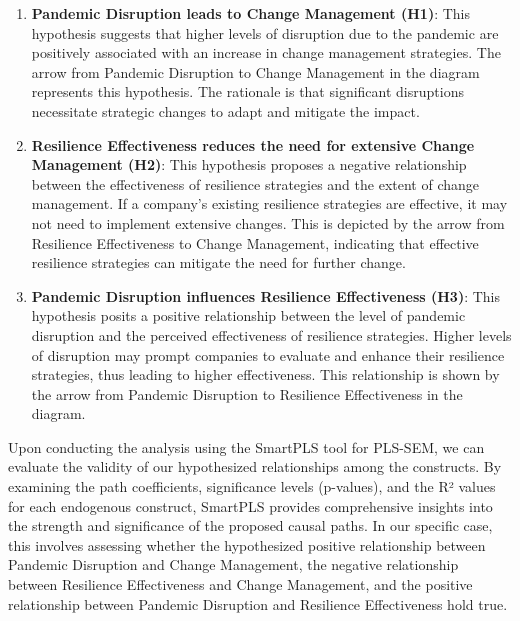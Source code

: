 \begin{enumerate}
    \item \textbf{Pandemic Disruption leads to Change Management (H1)}: This hypothesis suggests that higher levels of disruption due to the pandemic are positively associated with an increase in change management strategies. The arrow from Pandemic Disruption to Change Management in the diagram represents this hypothesis. The rationale is that significant disruptions necessitate strategic changes to adapt and mitigate the impact.

    \item \textbf{Resilience Effectiveness reduces the need for extensive Change Management (H2)}: This hypothesis proposes a negative relationship between the effectiveness of resilience strategies and the extent of change management. If a company’s existing resilience strategies are effective, it may not need to implement extensive changes. This is depicted by the arrow from Resilience Effectiveness to Change Management, indicating that effective resilience strategies can mitigate the need for further change.

    \item \textbf{Pandemic Disruption influences Resilience Effectiveness (H3)}: This hypothesis posits a positive relationship between the level of pandemic disruption and the perceived effectiveness of resilience strategies. Higher levels of disruption may prompt companies to evaluate and enhance their resilience strategies, thus leading to higher effectiveness. This relationship is shown by the arrow from Pandemic Disruption to Resilience Effectiveness in the diagram.

\end{enumerate}

Upon conducting the analysis using the SmartPLS tool for PLS-SEM, we can evaluate the validity of our hypothesized relationships among the constructs. By examining the path coefficients, significance levels (p-values), and the R² values for each endogenous construct, SmartPLS provides comprehensive insights into the strength and significance of the proposed causal paths. In our specific case, this involves assessing whether the hypothesized positive relationship between Pandemic Disruption and Change Management, the negative relationship between Resilience Effectiveness and Change Management, and the positive relationship between Pandemic Disruption and Resilience Effectiveness hold true. 

